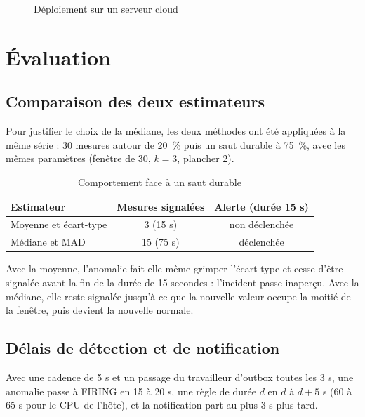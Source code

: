 \begin{figure}[htbp]
\centering
{}\hfill
{}\hfill
{}
\caption{Déploiement sur un serveur cloud}
\label{fig:cloud}
\end{figure}

\section{Évaluation}
\label{sec:evaluation}

\subsection{Comparaison des deux estimateurs}

Pour justifier le choix de la médiane, les deux méthodes ont été appliquées à la même série :
30 mesures autour de 20~\% puis un saut durable à 75~\%, avec les mêmes paramètres
(fenêtre de 30, $k = 3$, plancher 2).

\begin{table}[htbp]
\centering
\small
\begin{tabular}{lcc}
\toprule
\textbf{Estimateur} & \textbf{Mesures signalées} & \textbf{Alerte (durée 15 s)} \\
\midrule
Moyenne et écart-type & 3 (15 s) & non déclenchée \\
Médiane et MAD & 15 (75 s) & déclenchée \\
\bottomrule
\end{tabular}
\caption{Comportement face à un saut durable}
\label{tab:estimateurs}
\end{table}

Avec la moyenne, l'anomalie fait elle-même grimper l'écart-type et cesse d'être signalée avant
la fin de la durée de 15 secondes : l'incident passe inaperçu. Avec la médiane, elle reste
signalée jusqu'à ce que la nouvelle valeur occupe la moitié de la fenêtre, puis devient la
nouvelle normale.

\subsection{Délais de détection et de notification}

Avec une cadence de 5 s et un passage du travailleur d'outbox toutes les 3 s, une anomalie passe
à FIRING en 15 à 20 s, une règle de durée $d$ en $d$ à $d+5$ s (60 à 65 s pour le CPU de l'hôte),
et la notification part au plus 3 s plus tard.

